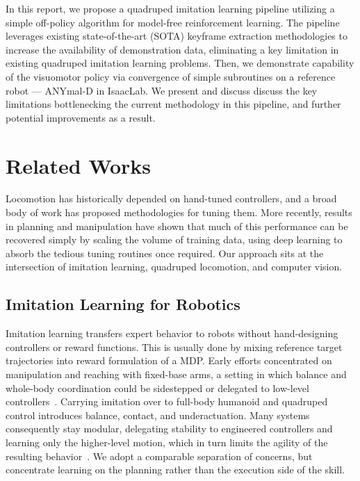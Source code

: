 \documentclass{article}
\theoremstyle{plain}
\theoremstyle{definition}
\theoremstyle{remark}
\begin{document}
In this report, we propose a quadruped imitation learning pipeline utilizing a simple off-policy algorithm for model-free reinforcement learning. The pipeline leverages existing state-of-the-art (SOTA) keyframe extraction methodologies to increase the availability of demonstration data, eliminating a key limitation in existing quadruped imitation learning problems. Then, we demonstrate capability of the visuomotor policy via convergence of simple subroutines on a reference robot --- ANYmal-D in IsaacLab. We present and discuss discuss the key limitations bottlenecking the current methodology in this pipeline, and further potential improvements as a result.

\section{Related Works}
\label{sec:related}

Locomotion has historically depended on hand-tuned controllers, and a broad
body of work has proposed methodologies for tuning them. More recently, results in planning and manipulation have shown that much of this performance can be recovered simply by scaling the volume of training data, using deep learning to absorb the tedious tuning routines once required. Our approach sits at the intersection of imitation learning, quadruped locomotion, and computer vision.

\subsection{Imitation Learning for Robotics}
Imitation learning transfers expert behavior to robots without hand-designing
controllers or reward functions. This is usually done by mixing reference target
trajectories into reward formulation of a MDP. Early efforts concentrated on manipulation 
and reaching with fixed-base arms, a setting in which balance and whole-body
coordination could be sidestepped or delegated to low-level
controllers~\cite{he2025asapaligningsimulationrealworld, Reske_2021}. Carrying
imitation over to full-body humanoid and quadruped control introduces balance,
contact, and underactuation. Many systems consequently stay modular, delegating
stability to engineered controllers and learning only the higher-level motion,
which in turn limits the agility of the resulting
behavior~\cite{he2025asapaligningsimulationrealworld, Reske_2021}. We adopt a
comparable separation of concerns, but concentrate learning on the planning
rather than the execution side of the skill.
\end{document}
